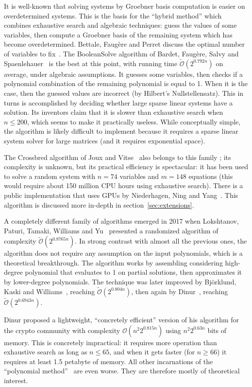 \documentclass[a4paper,UKenglish,cleveref, autoref]{lipics-v2019}
\newcommand{\bigO}[1]{\ensuremath{\mathcal{O}\left( #1 \right)} }
\newcommand{\bigOsoft}[1]{\ensuremath{\mathcal{\tilde O}\left( #1 \right)} }
\begin{document}
It is well-known that solving systems by Groebner basis computation is easier on
overdetermined systems. This is the basis for the ``hybrid method'' which
combines exhaustive search and algebraic techniques: guess the values of some
variables, then compute a Groebner basis of the remaining system which has
become overdetermined. Bettale, Faugère and Perret discuss the optimal number of
variables to fix~\cite{BettaleFP09}. The \textsf{BooleanSolve} algorithm of
Bardet, Faugère, Salvy and Spaenlehauer~\cite{BardetFSS13} is the best at this
point, with running time $\bigOsoft{2^{0.792n}}$ on average, under algebraic
assumptions. It guesses some variables, then checks if a polynomial combination
of the remaining polynomial is equal to 1. When it is the case, then the guessed
values are incorrect (by Hilbert's Nullstellensatz). This in turns is
accomplished by deciding whether large sparse linear systems have a
solution. Its inventors claim that it is slower than exhaustive search when
$n \leq 200$, which seems to make it practically useless. While conceptually
simple, the algorithm is likely difficult to implement because it requires a
sparse linear system solver for large matrices (and it requires exponential space).

The \textsf{Crossbred} algorithm of Joux and Vitse~\cite{JouxV17} also belongs
to this family ; its complexity is unknown, but its practical efficiency is
spectacular: it has been used to solve a random system with $n = 74$ variables
and $m=148$ equations (this would require about 150 million CPU hours using
exhaustive search). There is a public implementation that uses GPUs by
Niederhagen, Ning and Yang~\cite{NiederhagenNY18}. This algorithm is discussed
more in-depth in section~\ref{sec:extensions}.

A completely different family of algorithms emerged in 2017 when Lokshtanov,
Paturi, Tamaki, Williams and Yu~\cite{LokshtanovPTWY17} presented a randomized
algorithm of complexity $\bigOsoft{2^{0.8765n}}$. In strong contrast with almost
all the previous ones, the algorithm does not require any assumption on the
input polynomials, which is a theoretical breakthrough. The algorithm works by
assembling considering high-degree polynomial that evaluates to 1 on partial
solutions, then approximates it by lower-degree polynomials. The technique was
later improved by Björklund, Kaski and Williams~\cite{BjorklundK019}, reaching
$\bigOsoft{2^{0.804n}}$, then again by Dinur~\cite{Dinur21}, reaching
$\bigOsoft{2^{0.6943n}}$.

Dinur proposed a lightweight, ``concretely efficient'' version of his algorithm
for the crypto community with complexity $\bigO{n^2 2^{0.815n}}$ using
$n^2 2^{0.63n}$ bits of memory. This is concretely impractical: it requires more
operation than exhaustive search as long as $n \leq 65$, and when it gets faster
(for $n \geq 66$) it requires at least 1.5 petabyte of memory. All other
incarnations of the ``polynomial
method''~\cite{LokshtanovPTWY17,BjorklundK019,Dinur21} are even worse.  They are
therefore mostly of theoretical interest.
\end{document}
